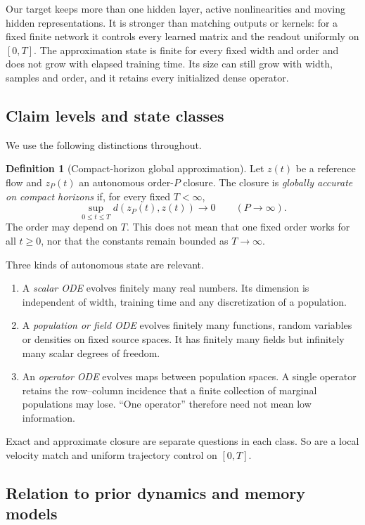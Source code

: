 \documentclass[11pt]{article}
\theoremstyle{definition}
\newtheorem{definition}[theorem]{Definition}
\theoremstyle{remark}
\begin{document}
Our target keeps more than one hidden layer, active nonlinearities and moving
hidden representations.  It is stronger than matching outputs or kernels: for a
fixed finite network it controls every learned matrix and the readout uniformly
on $[0,T]$.  The approximation state is finite for every fixed width and order
and does not grow with elapsed training time.  Its size can still grow with
width, samples and order, and it retains every initialized dense operator.

\subsection{Claim levels and state classes}

We use the following distinctions throughout.

\begin{definition}[Compact-horizon global approximation]
Let $z(t)$ be a reference flow and $z_P(t)$ an autonomous order-$P$ closure.
The closure is \emph{globally accurate on compact horizons} if, for every fixed
$T<\infty$,
\[
  \sup_{0\le t\le T} d(z_P(t),z(t))\longrightarrow0
  \qquad(P\to\infty).
\]
The order may depend on $T$.  This does not mean that one fixed order works for
all $t\ge0$, nor that the constants remain bounded as $T\to\infty$.
\end{definition}

Three kinds of autonomous state are relevant.
\begin{enumerate}
\item A \emph{scalar ODE} evolves finitely many real numbers.  Its dimension is
independent of width, training time and any discretization of a population.
\item A \emph{population or field ODE} evolves finitely many functions, random
variables or densities on fixed source spaces.  It has finitely many fields but
infinitely many scalar degrees of freedom.
\item An \emph{operator ODE} evolves maps between population spaces.  A single
operator retains the row--column incidence that a finite collection of marginal
populations may lose.  ``One operator'' therefore need not mean low information.
\end{enumerate}
Exact and approximate closure are separate questions in each class.  So are a
local velocity match and uniform trajectory control on $[0,T]$.

\subsection{Relation to prior dynamics and memory models}
\end{document}
